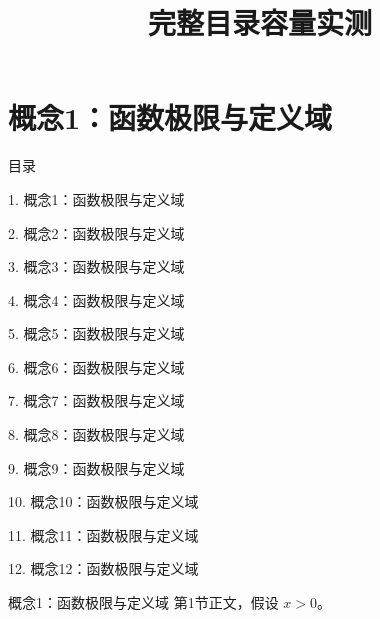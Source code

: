\documentclass[aspectratio=169,10pt,fontset=fandol]{ctexbeamer}
\title{完整目录容量实测}
\begin{document}
\section{概念1：函数极限与定义域}
\begin{frame}[t,fragile]{目录}
\small
{\color{blue}\small 1. 概念1：函数极限与定义域\par}\vspace{0.22em}
{\color{gray!40}\small 2. 概念2：函数极限与定义域\par}\vspace{0.22em}
{\color{gray!40}\small 3. 概念3：函数极限与定义域\par}\vspace{0.22em}
{\color{gray!40}\small 4. 概念4：函数极限与定义域\par}\vspace{0.22em}
{\color{gray!40}\small 5. 概念5：函数极限与定义域\par}\vspace{0.22em}
{\color{gray!40}\small 6. 概念6：函数极限与定义域\par}\vspace{0.22em}
{\color{gray!40}\small 7. 概念7：函数极限与定义域\par}\vspace{0.22em}
{\color{gray!40}\small 8. 概念8：函数极限与定义域\par}\vspace{0.22em}
{\color{gray!40}\small 9. 概念9：函数极限与定义域\par}\vspace{0.22em}
{\color{gray!40}\small 10. 概念10：函数极限与定义域\par}\vspace{0.22em}
{\color{gray!40}\small 11. 概念11：函数极限与定义域\par}\vspace{0.22em}
{\color{gray!40}\small 12. 概念12：函数极限与定义域\par}\vspace{0.22em}
\end{frame}
\begin{frame}[t,fragile]{概念1：函数极限与定义域}
\normalsize
{\normalsize
第1节正文，假设 $x>0$。
}
\end{frame}
\end{document}
